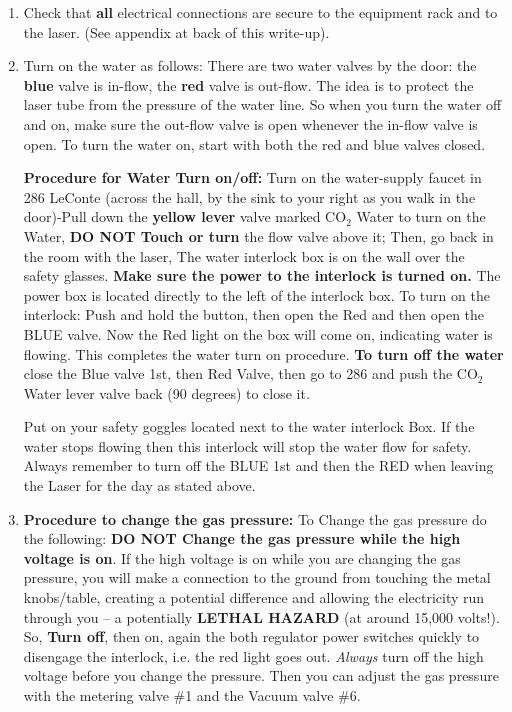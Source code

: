 \documentclass{../lab}
\begin{document}
\begin{enumerate}
    \item Check that \textbf{all} electrical connections are secure to the equipment rack and to the laser. (See appendix at back of this write-up).

    \item Turn on the water as follows: There are two water valves by the door: the \textbf{blue} valve is in-flow, the \textbf{red} valve is out-flow. The idea is to protect the laser tube from the pressure of the water line. So when you turn the water off and on, make sure the out-flow valve is open whenever the in-flow valve is open. To turn the water on, start with both the red and blue valves closed.
    
    \textbf{Procedure for Water Turn on/off:} Turn on the water-supply faucet in 286 LeConte (across the hall, by the sink to your right as you walk in the door)-Pull down the \textbf{yellow lever} valve marked CO$_2$ Water to turn on the Water, \textbf{DO NOT Touch or turn} the flow valve above it; Then, go back in the room with the laser, The water interlock box is on the wall over the safety glasses. \textbf{Make sure the power to the interlock is turned on.} The power box is located directly to the left of the interlock box. To turn on the interlock: Push and hold the button, then open the Red and then open the BLUE valve. Now the Red light on the box will come on, indicating water is flowing. This completes the water turn on procedure. \textbf{To turn off the water} close the Blue valve 1st, then Red Valve, then go to 286 and push the CO$_2$ Water lever valve back (90 degrees) to close it.
    
    Put on your safety goggles located next to the water interlock Box. If the water stops flowing then this interlock will stop the water flow for safety. Always remember to turn off the BLUE 1st and then the RED when leaving the Laser for the day as stated above.
    
    \item \textbf{Procedure to change the gas pressure:} To Change the gas pressure do the following: \textbf{DO NOT Change the gas pressure while the high voltage is on}.  If the high voltage is on while you are changing the gas pressure, you will make a connection to the ground from touching the metal knobs/table, creating a potential difference and allowing the electricity run through you -- a potentially \textbf{LETHAL HAZARD} (at around 15,000 volts!). So, \textbf{Turn off}, then on, again the both regulator power switches quickly to disengage the interlock, i.e. the red light goes out. \emph{Always} turn off the high voltage before you change the pressure. Then you can adjust the gas pressure with the metering valve \#1 and the Vacuum valve \#6.
    

\end{enumerate}
\end{document}
